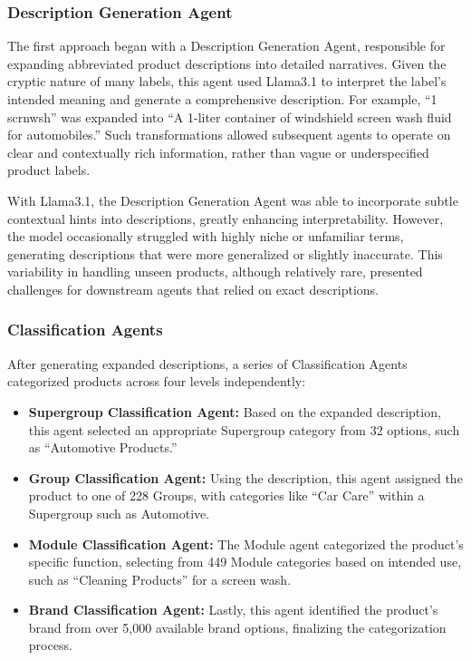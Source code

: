 \documentclass[9pt,a4paper,twoside]{rho-class/rho}
\begin{document}
\subsubsection{Description Generation Agent}
The first approach began with a Description Generation Agent, responsible for expanding abbreviated product descriptions into detailed narratives. Given the cryptic nature of many labels, this agent used Llama3.1 to interpret the label's intended meaning and generate a comprehensive description. For example, “1 scrnwsh” was expanded into “A 1-liter container of windshield screen wash fluid for automobiles.” Such transformations allowed subsequent agents to operate on clear and contextually rich information, rather than vague or underspecified product labels.

With Llama3.1, the Description Generation Agent was able to incorporate subtle contextual hints into descriptions, greatly enhancing interpretability. However, the model occasionally struggled with highly niche or unfamiliar terms, generating descriptions that were more generalized or slightly inaccurate. This variability in handling unseen products, although relatively rare, presented challenges for downstream agents that relied on exact descriptions.

\subsubsection{Classification Agents}
After generating expanded descriptions, a series of Classification Agents categorized products across four levels independently:
\begin{itemize}
    \item \textbf{Supergroup Classification Agent:} Based on the expanded description, this agent selected an appropriate Supergroup category from 32 options, such as “Automotive Products.”
    \item \textbf{Group Classification Agent:} Using the description, this agent assigned the product to one of 228 Groups, with categories like “Car Care” within a Supergroup such as Automotive.
    \item \textbf{Module Classification Agent:} The Module agent categorized the product’s specific function, selecting from 449 Module categories based on intended use, such as “Cleaning Products” for a screen wash.
    \item \textbf{Brand Classification Agent:} Lastly, this agent identified the product’s brand from over 5,000 available brand options, finalizing the categorization process.
\end{itemize}
\end{document}
